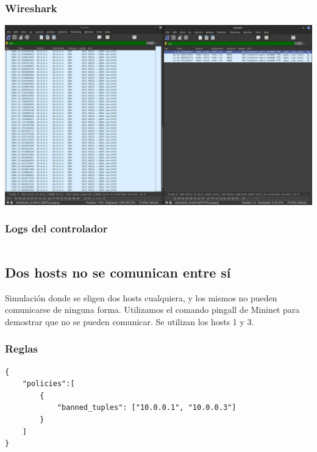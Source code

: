 \documentclass{article}
\begin{document}
\subsubsection{Wireshark}
\begin{center}
\includegraphics[scale=0.2]{Multi_Rules_WS_.png}

\end{center}

\subsubsection{Logs del controlador}
\begin{center}
  \inputminted[fontsize=\footnotesize]{text}{informe/logs/Multi_Rules_WS.txt}
  
\end{center}

\subsection{Dos hosts no se comunican entre sí}
Simulación donde se eligen dos hosts cualquiera, y los mismos no pueden comunicarse de ninguna forma. Utilizamos el comando pingall de Mininet para demostrar que no se pueden comunicar. Se utilizan los hosts 1 y 3.

\subsubsection{Reglas}
\begin{verbatim}
{
    "policies":[
        {
            "banned_tuples": ["10.0.0.1", "10.0.0.3"]
        }
    ]
}
\end{verbatim}
\end{document}
